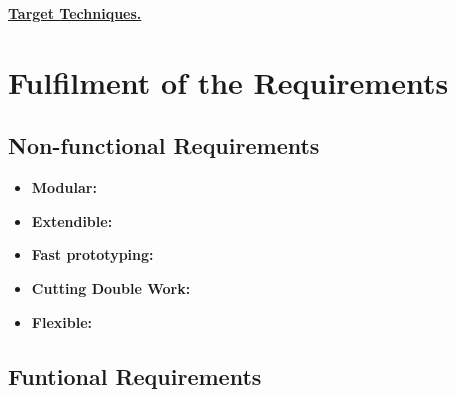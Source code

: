 \underline{\textbf{Target Techniques.}}















\section{Fulfilment of the Requirements}

\subsection{Non-functional Requirements}
\begin{itemize}
	\item \textbf{Modular:} 
	\item \textbf{Extendible:} 
	\item \textbf{Fast prototyping:} 
	\item \textbf{Cutting Double Work:} 
	\item \textbf{Flexible:} 

\end{itemize}

\subsection{Funtional Requirements}
